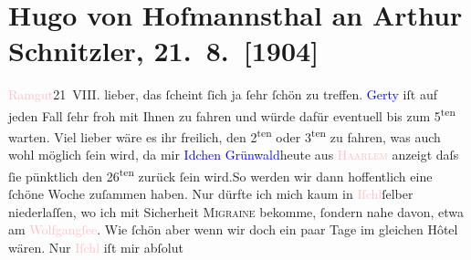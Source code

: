 

               \section[Hugo von Hofmannsthal an Arthur Schnitzler, 21. 8. {[}1904{]}]{ Hugo von Hofmannsthal an Arthur Schnitzler, 21. 8. {[}1904{]}}\nopagebreak{}\rehead{ }\normalsize\beginnumbering{} \toendnotes[C]{\smallbreak\pagebreak[2]} 
\toendnotes[C]{\smallbreak}\pstart
           \raggedleft{}{\pb}\textcolor{pink}{Ramgut}{}\ledrightnote{\textcolor{pink}{Ramgut}}{ }21 VIII.\pend
           \pstart{}lieber, \pend\pstart
           das ſcheint ſich ja ſehr ſchön zu treffen. \textcolor{blue}{Gerty}{}\ledrightnote{\textcolor{blue}{Gertrude von Hofmannsthal}}
               iſt auf jeden Fall ſehr froh mit Ihnen zu fahren und würde dafür eventuell bis zum
                     5\textsuperscript{ten} warten. Viel lieber wäre es ihr freilich, den 2\textsuperscript{ten} oder 3\textsuperscript{ten} zu fahren, was auch wohl möglich ſein wird, da mir \textcolor{blue}{Idchen Grünwald}{}\ledrightnote{\textcolor{blue}{Ida Grünwald}}{ }{\pb}heute aus \textcolor{pink}{\textsc{Haarlem}}{}\ledrightnote{\textcolor{pink}{Haarlem}} anzeigt daſs ſie pünktlich den 26\textsuperscript{ten} zurück ſein wird.\hspace*{1.5em}So werden wir dann
               hoffentlich eine ſchöne Woche zuſammen haben. Nur dürfte ich mich kaum in \textcolor{pink}{Iſchl}{}\ledrightnote{\textcolor{pink}{Bad Ischl}}{ }ſelber niederlaſſen, wo ich mit Sicherheit \textsc{Migraine} bekomme, ſondern nahe davon, etwa am \textcolor{pink}{Wolfgangſee}{}\ledrightnote{\textcolor{pink}{Wolfgangsee}}. Wie ſchön {\pb}aber wenn wir doch ein paar Tage
               im gleichen Hôtel wären. Nur \textcolor{pink}{Iſchl}{}\ledrightnote{\textcolor{pink}{Bad Ischl}} iſt mir abſolut
